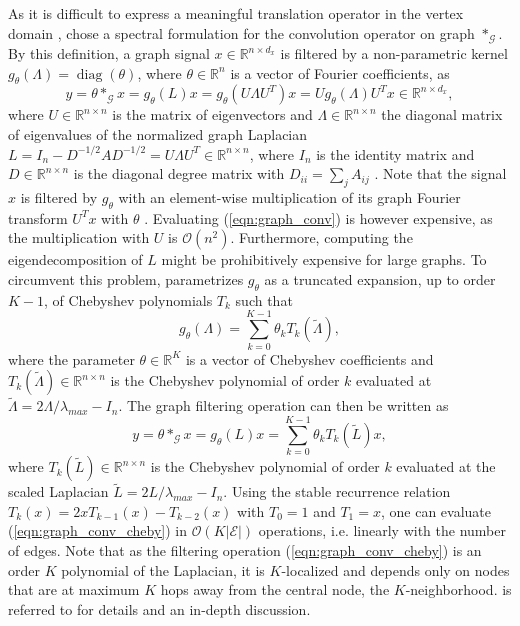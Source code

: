 \documentclass{article} %
\DeclareMathOperator*{\diag}{diag}
\newcommand{\R}{\mathbb{R}}
\newcommand{\bO}{\mathcal{O}}
\newcommand{\G}{\mathcal{G}}
\newcommand{\E}{\mathcal{E}}
\newcommand{\eqnref}[1]{(\ref{eqn:#1})}
\begin{document}
As it is difficult to express a meaningful translation operator in the vertex
domain \citep{gcnn_bruna, gcnn_niepert}, \citet{gcnn} chose a spectral
formulation for the convolution operator on graph $\ast_\G$. By this
definition, a graph signal $x \in \R^{n \times d_x}$ is filtered by a non-parametric kernel
$g_\theta(\Lambda) = \diag(\theta)$, where $\theta \in \R^n$ is a vector of
Fourier coefficients, as
\begin{equation} \label{eqn:graph_conv}
	y = \theta \ast_\G x = g_\theta(L) x =
	g_\theta(U \Lambda U^T) x = U g_\theta(\Lambda) U^T x \in \R^{n \times d_x},
\end{equation}
where $U \in \R^{n \times n}$ is the matrix of eigenvectors and $\Lambda \in
\R^{n \times n}$ the diagonal matrix of eigenvalues of the normalized graph
Laplacian $L = I_n - D^{-1/2} A D^{-1/2} = U \Lambda U^T \in \R^{n \times n}$,
where $I_n$ is the identity matrix and $D \in \R^{n \times n}$ is the diagonal
degree matrix with $D_{ii} = \sum_j A_{ij}$ \citep{chung}.  Note that the
signal $x$ is filtered by $g_\theta$ with an element-wise multiplication of its
graph Fourier transform $U^T x$ with $\theta$ \citep{gsp}. Evaluating
\eqnref{graph_conv} is however expensive, as the multiplication with $U$ is
$\bO(n^2)$. Furthermore, computing the eigendecomposition of $L$ might be
prohibitively expensive for large graphs. To circumvent this problem,
\cite{gcnn} parametrizes $g_\theta$ as a truncated expansion, up to order
$K-1$, of Chebyshev polynomials $T_k$ such that
\begin{equation} \label{eq:filt_cheby}
	g_\theta(\Lambda) = \sum_{k=0}^{K-1} \theta_k T_k(\tilde{\Lambda}),
\end{equation}
where the parameter $\theta \in \R^K$ is a vector of Chebyshev coefficients and
$T_k(\tilde{\Lambda}) \in \R^{n \times n}$ is the Chebyshev polynomial of order
$k$ evaluated at $\tilde{\Lambda} = 2 \Lambda / \lambda_{max} - I_n$. The
graph filtering operation can then be written as
\begin{equation} \label{eqn:graph_conv_cheby}
	y = \theta \ast_\G x = g_\theta(L) x = \sum_{k=0}^{K-1} \theta_k T_k(\tilde{L}) x,
\end{equation}
where $T_k(\tilde{L}) \in \R^{n \times n}$ is the Chebyshev polynomial of order
$k$ evaluated at the scaled Laplacian $\tilde{L} = 2 L / \lambda_{max} - I_n$.
Using the stable recurrence relation $T_k(x) = 2x T_{k-1}(x) - T_{k-2}(x)$ with
$T_0 = 1$ and $T_1 = x$, one can evaluate \eqnref{graph_conv_cheby} in
$\bO(K|\E|)$ operations, i.e. linearly with the number of edges. Note that as
the filtering operation \eqnref{graph_conv_cheby} is an order $K$ polynomial of
the Laplacian, it is $K$-localized and depends only on nodes that are at
maximum $K$ hops away from the central node, the $K$-neighborhood. %
is referred to \cite{gcnn} for details and an in-depth discussion.
\end{document}
